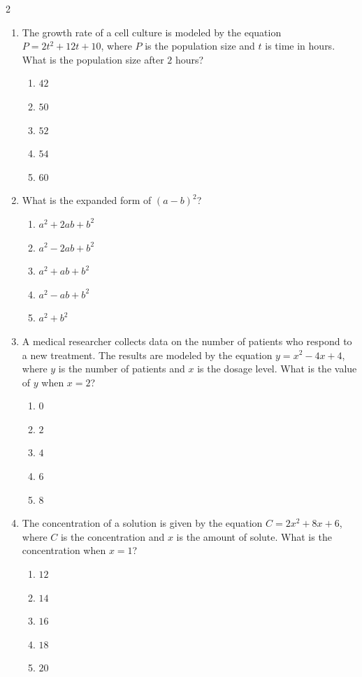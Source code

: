 \documentclass[10pt]{article}
\begin{document}
\begin{multicols}{2}
\begin{enumerate}[label=\textbf{Q\arabic*.}, leftmargin=*, itemsep=6pt, parsep=0pt]
  \item \small The growth rate of a cell culture is modeled by the equation $P = 2t^2 + 12t + 10$, where $P$ is the population size and $t$ is time in hours. What is the population size after $2$ hours?
  \begin{enumerate}[label=(\Alph*), leftmargin=0.6cm, nosep, itemsep=2pt]
    \item $42$
    \item $50$
    \item $52$
    \item $54$
    \item $60$
  \end{enumerate}

  \item \small What is the expanded form of $(a - b)^2$?
  \begin{enumerate}[label=(\Alph*), leftmargin=0.6cm, nosep, itemsep=2pt]
    \item $a^2 + 2ab + b^2$
    \item $a^2 - 2ab + b^2$
    \item $a^2 + ab + b^2$
    \item $a^2 - ab + b^2$
    \item $a^2 + b^2$
  \end{enumerate}

  \item \small A medical researcher collects data on the number of patients who respond to a new treatment. The results are modeled by the equation $y = x^2 - 4x + 4$, where $y$ is the number of patients and $x$ is the dosage level. What is the value of $y$ when $x = 2$?
  \begin{enumerate}[label=(\Alph*), leftmargin=0.6cm, nosep, itemsep=2pt]
    \item $0$
    \item $2$
    \item $4$
    \item $6$
    \item $8$
  \end{enumerate}

  \item \small The concentration of a solution is given by the equation $C = 2x^2 + 8x + 6$, where $C$ is the concentration and $x$ is the amount of solute. What is the concentration when $x = 1$?
  \begin{enumerate}[label=(\Alph*), leftmargin=0.6cm, nosep, itemsep=2pt]
    \item $12$
    \item $14$
    \item $16$
    \item $18$
    \item $20$
  \end{enumerate}


\end{enumerate}
\end{multicols}
\end{document}
